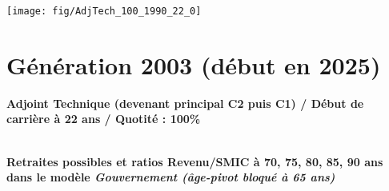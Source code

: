  \vspace{0.1cm} 

 {\hspace{-2.2cm}\texttt{[image: fig/AdjTech\_100\_1990\_22\_0]}} 

\newpage 
 
\section{Génération 2003 (début en 2025)\label{AdjTech_100_2003_22_0}} 
 
{\bf \noindent Adjoint Technique (devenant principal C2 puis C1) / Début de carrière à 22 ans / Quotité : 100\%}  ~ 

 ~\\{\bf \noindent Retraites possibles et ratios Revenu/SMIC à 70, 75, 80, 85, 90 ans dans le modèle \emph{Gouvernement (âge-pivot bloqué à 65 ans)}}  
 
